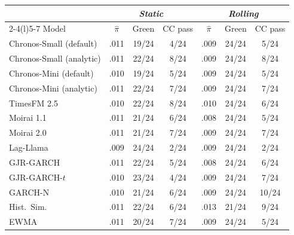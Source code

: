 \begin{tabular}{@{}lcccccc@{}}
\toprule
& \multicolumn{3}{c}{\textit{Static}}
& \multicolumn{3}{c}{\textit{Rolling}} \\
\cmidrule(lr){2-4}\cmidrule(l){5-7}
Model & $\hat\pi$ & Green & CC pass
& $\hat\pi$ & Green & CC pass \\
\midrule
Chronos-Small (default) & .011 & 19/24 &  4/24
& .009 & 24/24 &  5/24 \\
Chronos-Small (analytic) & .011 & 22/24 &  8/24
& .009 & 24/24 &  8/24 \\
Chronos-Mini (default) & .010 & 19/24 &  5/24
& .009 & 24/24 &  5/24 \\
Chronos-Mini (analytic) & .011 & 22/24 &  7/24
& .009 & 24/24 &  7/24 \\
TimesFM 2.5 & .010 & 22/24 &  8/24
& .010 & 24/24 &  6/24 \\
\midrule
Moirai 1.1 & .011 & 21/24 &  6/24
& .008 & 24/24 &  5/24 \\
Moirai 2.0 & .011 & 21/24 &  7/24
& .009 & 24/24 &  7/24 \\
Lag-Llama & .009 & 24/24 &  2/24
& .009 & 24/24 &  2/24 \\
GJR-GARCH & .011 & 22/24 &  5/24
& .008 & 24/24 &  6/24 \\
GJR-GARCH-$t$ & .010 & 23/24 &  4/24
& .009 & 24/24 &  7/24 \\
GARCH-N & .010 & 21/24 &  6/24
& .009 & 24/24 & 10/24 \\
Hist.\ Sim. & .011 & 22/24 &  6/24
& .013 & 21/24 &  9/24 \\
EWMA & .011 & 20/24 &  7/24
& .009 & 24/24 &  5/24 \\
\bottomrule
\end{tabular}

